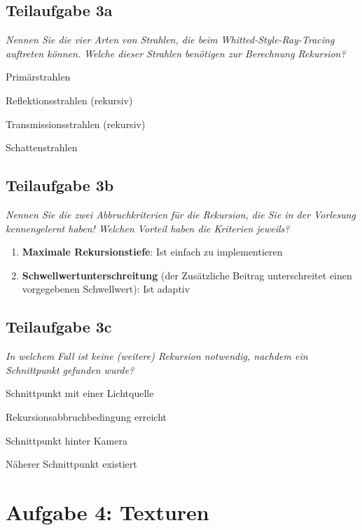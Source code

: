 \documentclass[a4paper]{scrartcl}
\begin{document}
\subsection*{Teilaufgabe 3a}
\textit{Nennen Sie die vier Arten von Strahlen, die beim
Whitted-Style-Ray-Tracing auftreten können. Welche dieser Strahlen benötigen
zur Berechnung Rekursion?}

\begin{enumerate*}[label=(\arabic*)]
    \item Primärstrahlen
    \item Reflektionsstrahlen (rekursiv)
    \item Transmissionsstrahlen (rekursiv)
    \item Schattenstrahlen
\end{enumerate*}

\clearpage
\subsection*{Teilaufgabe 3b}
\textit{Nennen Sie die zwei Abbruchkriterien für die Rekursion, die Sie in der
Vorlesung kennengelernt haben! Welchen Vorteil haben die Kriterien jeweils?}
\begin{enumerate}[label=(\arabic*)]
    \item \textbf{Maximale Rekursionstiefe}: Ist einfach zu implementieren
    \item \textbf{Schwellwertunterschreitung} (der Zusätzliche Beitrag
    unterschreitet einen vorgegebenen Schwellwert): Ist adaptiv
\end{enumerate}

\subsection*{Teilaufgabe 3c}
\textit{In welchem Fall ist keine (weitere) Rekursion notwendig, nachdem ein
Schnittpunkt gefunden wurde?}

\begin{enumerate*}[label=(\arabic*)]
    \item Schnittpunkt mit einer Lichtquelle
    \item Rekursionsabbruchbedingung erreicht
    \item Schnittpunkt hinter Kamera
    \item Näherer Schnittpunkt existiert
\end{enumerate*}

\section*{Aufgabe 4: Texturen}
\end{document}
